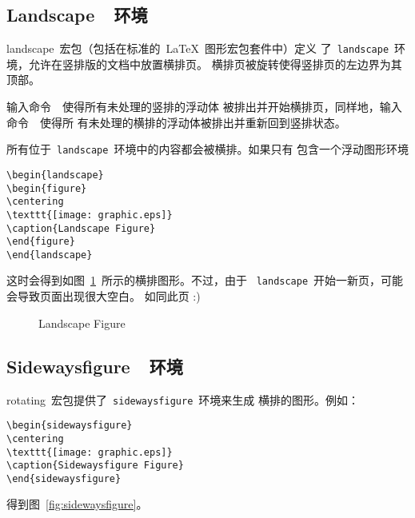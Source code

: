 \subsection{Landscape~~环境}\label{ssec:landscape}

\textsf{landscape}~宏包（包括在标准的~\LaTeX{}~图形宏包套件中）定义
了~\texttt{landscape}~环境，允许在竖排版的文档中放置横排页。
横排页被旋转使得竖排页的左边界为其顶部。

输入命令~~使得所有未处理的竖排的浮动体
被排出并开始横排页，同样地，输入命令~~使得所
有未处理的横排的浮动体被排出并重新回到竖排状态。

所有位于~\texttt{landscape}~环境中的内容都会被横排。如果只有
包含一个浮动图形环境
\begin{Verbatim}[xleftmargin=1cm]
\begin{landscape} 
\begin{figure} 
\centering 
\texttt{[image: graphic.eps]} 
\caption{Landscape Figure} 
\end{figure} 
\end{landscape}
\end{Verbatim}
这时会得到如图~\ref{fig:landscape}~所示的横排图形。不过，由于
~\texttt{landscape}~开始一新页，可能会导致页面出现很大空白。
如同此页 :)

\begin{landscape} 
	\begin{figure} 
		\centering
		\resizebox{4in}{!}{\usebox{\graphic}}
		\caption{Landscape Figure}\label{fig:landscape}
	\end{figure} 
\end{landscape}

\subsection{Sidewaysfigure~~环境}\label{ssec:sidewaysfigure}

\textsf{rotating}~宏包提供了~\texttt{sidewaysfigure}~环境来生成
横排的图形。例如：
\begin{Verbatim}[xleftmargin=1cm]
\begin{sidewaysfigure} 
\centering 
\texttt{[image: graphic.eps]} 
\caption{Sidewaysfigure Figure} 
\end{sidewaysfigure}
\end{Verbatim}
得到图~\ref{fig:sidewaysfigure}。

\begin{sidewaysfigure}
	\centering
	\resizebox{4in}{!}{\usebox{\graphic}}
	\caption{Sidewaysfigure Figure}\label{fig:sidewaysfigure}
\end{sidewaysfigure}

